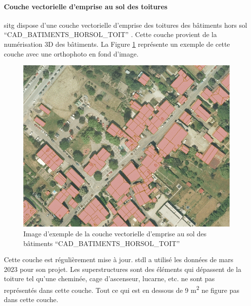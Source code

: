 \paragraph{Couche vectorielle d'emprise au sol des toitures}
\par{\acrshort{sitg} dispose d'une couche vectorielle d'emprise des toitures des bâtiments hors sol ``CAD\_BATIMENTS\_HORSOL\_TOIT'' \cite{sitg_toits_nodate}. Cette couche provient de la numérisation 3D des bâtiments. La Figure \ref{fig:stdl_01_couche_vectorielle} représente un exemple de cette couche avec une orthophoto en fond d'image.}
\begin{figure}[H]
    \centering
    \includegraphics[width=1\linewidth]{02-main//figures/ch2/stdl_01_couche_vectorielle.png}
    \caption{Image d’exemple de la couche vectorielle d’emprise au sol des bâtiments ``CAD\_BATIMENTS\_HORSOL\_TOIT'' \cite{sitg_toits_nodate}}
    \label{fig:stdl_01_couche_vectorielle}
\end{figure}
\par{Cette couche est régulièrement mise à jour. \acrshort{stdl} a utilisé les données de mars 2023 pour son projet. Les superstructures sont des éléments qui dépassent de la toiture tel qu'une cheminée, cage d'ascenseur, lucarne, etc. ne sont pas représentés dans cette couche. Tout ce qui est en dessous de 9 \si{\unit{m^2}} ne figure pas dans cette couche.}

